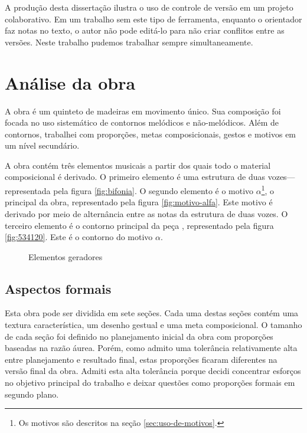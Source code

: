 A produção desta dissertação ilustra o uso de controle de versão em um
projeto colaborativo. Em um trabalho sem este tipo de ferramenta,
enquanto o orientador faz notas no texto, o autor não pode editá-lo
para não criar conflitos entre as versões. Neste trabalho pudemos
trabalhar sempre simultaneamente.

\chapter{Análise da obra \obra{}}
\label{cha:anal-da-obra}

A obra \obra{} é um quinteto de madeiras em movimento único. Sua
composição foi focada no uso sistemático de contornos melódicos e
não-melódicos. Além de contornos, trabalhei com proporções, metas
composicionais, gestos e motivos em um nível secundário.

A obra contém três elementos musicais a partir dos quais todo o
material composicional é derivado. O primeiro elemento é uma estrutura
de duas vozes---representada pela figura \ref{fig:bifonia}. O segundo
elemento é o motivo $\alpha$\footnote{Os motivos são descritos na
  seção \ref{sec:uso-de-motivos}.}, o principal da obra, representado
pela figura \ref{fig:motivo-alfa}. Este motivo é derivado por meio de
alternância entre as notas da estrutura de duas vozes. O terceiro
elemento é o contorno principal da peça \contpr{}, representado pela
figura \ref{fig:534120}. Este é o contorno do motivo $\alpha$.

\begin{figure}
  \centering

  \caption{Elementos geradores}
  \label{fig:elementos-geradores}
\end{figure}

\section{Aspectos formais}
\label{sec:aspectos-formais}

Esta obra pode ser dividida em sete seções. Cada uma destas seções
contém uma textura característica, um desenho gestual e uma meta
composicional.
O tamanho de cada seção foi definido no planejamento inicial da obra
com proporções baseadas na razão áurea.
Porém, como admito uma tolerância relativamente alta entre
planejamento e resultado final, estas proporções ficaram diferentes na
versão final da obra.
Admiti esta alta tolerância porque decidi concentrar esforços no
objetivo principal do trabalho e deixar questões como proporções
formais em segundo plano.

